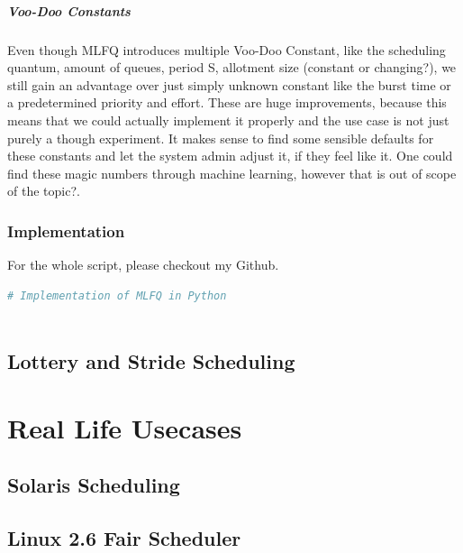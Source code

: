 \documentclass{report}
\begin{document}
\subsubsection{Voo-Doo Constants}

Even though MLFQ introduces multiple Voo-Doo Constant, like the scheduling quantum, amount of queues, period S, allotment size (constant or changing?), %
we still gain an advantage over just simply unknown constant like the burst time or a predetermined priority and effort. These are huge improvements, because this means that we could actually implement it properly and the use case is not just purely a though experiment. 
It makes sense to find some sensible defaults for these constants and let the system admin adjust it, if they feel like it. One could find these magic numbers through machine learning, however that is out of scope of the topic?.
\section{Implementation}

For the whole script, please checkout my Github.

\begin{lstlisting}[language=Python, style=colorEX, label=cd:mlfq-python]
  # Implementation of MLFQ in Python
  
\end{lstlisting}

\chapter{Lottery and Stride Scheduling}

\part{Real Life Usecases}

\chapter{Solaris Scheduling}

\chapter{Linux 2.6 Fair Scheduler}
\end{document}
